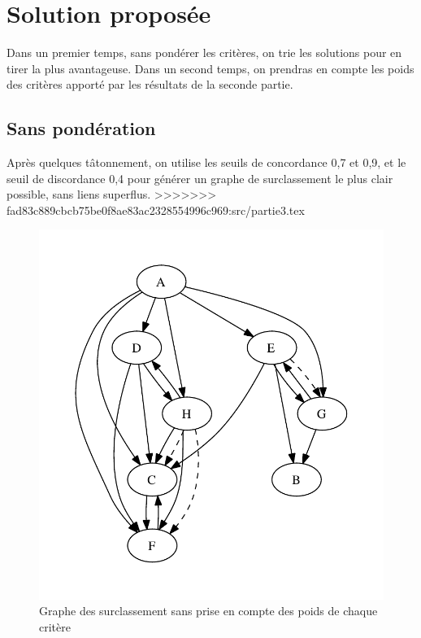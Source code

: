 \section{Solution proposée}

Dans un premier temps, sans pondérer les critères, on trie les solutions pour en tirer la plus avantageuse. Dans un second temps, on prendras en compte les poids des critères apporté par les résultats de la seconde partie.

\subsection{Sans pondération}

Après quelques tâtonnement, on utilise les seuils de concordance 0,7 et 0,9, et le seuil de discordance 0,4 pour générer un graphe de surclassement le plus clair possible, sans liens superflus.
>>>>>>> fad83c889cbcb75be0f8ae83ac2328554996c969:src/partie3.tex

\begin{figure}[!ht]
\includegraphics{../SourcesMatlab/electre3-1.pdf}
\caption{Graphe des surclassement sans prise en compte des poids de chaque critère}
\end{figure}

